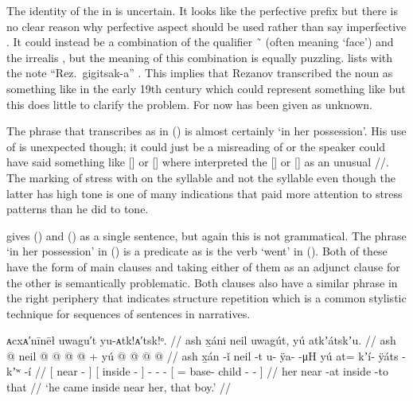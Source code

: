 The identity of the  in  is uncertain.
It looks like the perfective prefix but there is no clear reason why perfective aspect should be used rather than say imperfective .
It could instead be a combination of the qualifier  \~\  (often meaning ‘face’) and the irrealis , but the meaning of this combination is equally puzzling.
\citeauthor{leer:1973} lists  with the note “Rez.\ gigitsak-a” \parencite[09/146]{leer:1973}.
This implies that Rezanov transcribed the noun as something like  in the early 19th century which could represent something like  but this does little to clarify the problem.
For now  has been given as unknown.

The phrase that \citeauthor{swanton:1909} transcribes as  in (\lastx) is almost certainly  ‘in her possession’.
His use of  is unexpected though; it could just be a misreading of  or the speaker could have said something like [] or [] where \citeauthor{swanton:1909} interpreted the [] or [] as an unusual //.
The marking of stress with  on the syllable  and not the syllable  even though the latter has high tone is one of many indications that \citeauthor{swanton:1909} paid more attention to stress patterns than he did to tone.

\citeauthor{swanton:1909} gives (\lastx) and (\nextx) as a single sentence, but again this is not grammatical.
The phrase  ‘in her possession’ in (\lastx) is a predicate as is the verb  ‘went’ in (\nextx).
Both of these have the form of main clauses and taking either of them as an adjunct clause for the other is semantically problematic.
Both clauses also have a similar phrase in the right periphery that indicates structure repetition which is a common stylistic technique for sequences of sentences in narratives.

\ex\label{ex:94-17-he-came-inside-near-her}%
%
\begingl
	\glpreamble	ᴀcxᴀ′nīnēł uwagu′t yu-ᴀtk!ᴀ′tsk!ᵒ. //
	\glpreamble	ash x̱áni neil uwagút, yú atkʼátskʼu. //
	\gla	{} ash  @ {} {}
		{} neil @ {} {}
		 @ {} @ {} @ {} +
		{} yú  @ {} @ {} @ {} @ {} {} //
	\glb	{} ash x̱án -ǐ {}
		{} neil -t {}
		u- ÿa-  -μH
		{} yú at= kʼí- ÿáts -kʼʷ -í {} //
	\glc	{}[  near - {}]
		{}[ inside - {}]
		- -  -
		{}[  = base- child - - {}] //
	\gld	{} her near -at {}
		{} inside -to {}
		 {} {} {}
		{} that  {} {} {} {} {} //
	\glft	‘he came inside near her, that boy.’
		//
\endgl
\xe

